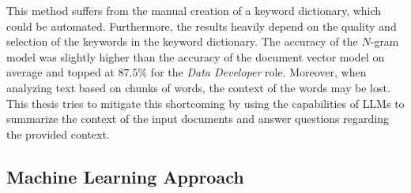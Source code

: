 \documentclass[draft,final]{thesisclass} %
\begin{document}
This method suffers from the manual creation of a keyword dictionary, which could be automated. 
Furthermore, the results heavily depend on the quality and selection of the keywords in the keyword dictionary.
The accuracy of the $N$-gram model was slightly higher than the accuracy of the document vector model on average and topped at $87.5\%$ for the \textit{Data Developer} role.
Moreover, when analyzing text based on chunks of words, the context of the words may be lost.
This thesis tries to mitigate this shortcoming by using the capabilities of \acs{LLM}s to summarize the context of the input documents and answer questions regarding the provided context.

\subsection{Machine Learning Approach} \label{machine_learning_approach}
\end{document}
